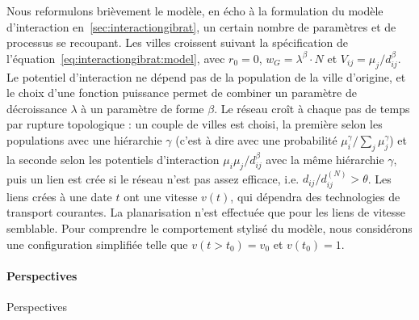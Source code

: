 Nous reformulons brièvement le modèle, en écho à la formulation du modèle d'interaction en~\ref{sec:interactiongibrat}, un certain nombre de paramètres et de processus se recoupant. Les villes croissent suivant la spécification de l'équation~\ref{eq:interactiongibrat:model}, avec $r_0 = 0$, $w_G = \lambda^\beta \cdot N$ et $V_{ij} = \mu_j / d_{ij}^\beta$. Le potentiel d'interaction ne dépend pas de la population de la ville d'origine, et le choix d'une fonction puissance permet de combiner un paramètre de décroissance $\lambda$ à un paramètre de forme $\beta$. Le réseau croît à chaque pas de temps par rupture topologique : un couple de villes est choisi, la première selon les populations avec une hiérarchie $\gamma$ (c'est à dire avec une probabilité $\mu_i^\gamma / \sum_j \mu_j^\gamma$) et la seconde selon les potentiels d'interaction $\mu_i \mu_j / d_{ij}^\beta$ avec la même hiérarchie $\gamma$, puis un lien est crée si le réseau n'est pas assez efficace, i.e. $d_{ij}/d^{(N)}_{ij}> \theta$. Les liens crées à une date $t$ ont une vitesse $v(t)$, qui dépendra des technologies de transport courantes. La planarisation n'est effectuée que pour les liens de vitesse semblable. Pour comprendre le comportement stylisé du modèle, nous considérons une configuration simplifiée telle que $v(t > t_0) = v_0$ et $v(t_0) = 1$.




\paragraph{Perspectives}{Perspectives}

